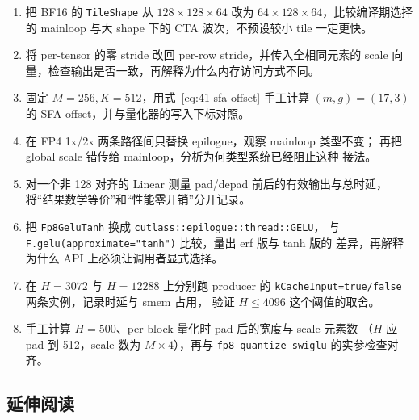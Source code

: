 \begin{enumerate}[itemsep=1pt,topsep=2pt]
  \item 把 BF16 的 \texttt{TileShape} 从 $128\times128\times64$ 改为
        $64\times128\times64$，比较编译期选择的 mainloop 与大 shape 下的
        CTA 波次，不预设较小 tile 一定更快。
  \item 将 per-tensor 的零 stride 改回 per-row stride，并传入全相同元素的
        scale 向量，检查输出是否一致，再解释为什么内存访问方式不同。
  \item 固定 $M=256,K=512$，用式~\ref{eq:41-sfa-offset} 手工计算
        $(m,g)=(17,3)$ 的 SFA offset，并与量化器的写入下标对照。
  \item 在 FP4 1x/2x 两条路径间只替换 epilogue，观察 mainloop 类型不变；
        再把 global scale 错传给 mainloop，分析为何类型系统已经阻止这种
        接法。
  \item 对一个非 128 对齐的 Linear 测量 pad/depad 前后的有效输出与总时延，
        将“结果数学等价”和“性能零开销”分开记录。
  \item 把 \texttt{Fp8GeluTanh} 换成 \texttt{cutlass::epilogue::thread::GELU}，
        与 \texttt{F.gelu(approximate="tanh")} 比较，量出 erf 版与 tanh 版的
        差异，再解释为什么 API 上必须让调用者显式选择。
  \item 在 $H=3072$ 与 $H=12288$ 上分别跑 producer 的
        \texttt{kCacheInput=true/false} 两条实例，记录时延与 smem 占用，
        验证 $H\le4096$ 这个阈值的取舍。
  \item 手工计算 $H=500$、per-block 量化时 pad 后的宽度与 scale 元素数
        （$H$ 应 pad 到 512，scale 数为 $M\times4$），再与
        \texttt{fp8\_quantize\_swiglu} 的实参检查对齐。
\end{enumerate}

\subsection{延伸阅读}

